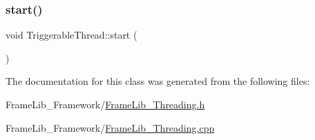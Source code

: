 \mbox{\label{class_triggerable_thread_acda64886ceb38f18168d4af4c27391ed}} 
\subsubsection{\texorpdfstring{start()}{start()}}
{\footnotesize\ttfamily void Triggerable\+Thread\+::start (\begin{DoxyParamCaption}{ }\end{DoxyParamCaption})\hspace{0.3cm}{\ttfamily [inline]}}



The documentation for this class was generated from the following files\+:\begin{DoxyCompactItemize}
\item 
Frame\+Lib\+\_\+\+Framework/\hyperlink{_frame_lib___threading_8h}{Frame\+Lib\+\_\+\+Threading.\+h}\item 
Frame\+Lib\+\_\+\+Framework/\hyperlink{_frame_lib___threading_8cpp}{Frame\+Lib\+\_\+\+Threading.\+cpp}\end{DoxyCompactItemize}
